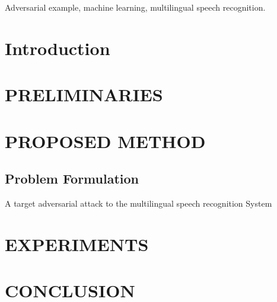 \documentclass[journal]{IEEEtran}
\begin{document}
\begin{IEEEkeywords}
Adversarial example, machine learning, multilingual speech recognition.
\end{IEEEkeywords}


\IEEEpeerreviewmaketitle



\section{Introduction}

\section{PRELIMINARIES}

\section{PROPOSED METHOD}
\subsection{Problem Formulation}
A target adversarial attack to the multilingual speech recognition System 

\section{EXPERIMENTS}

\section{CONCLUSION}
\end{document}
